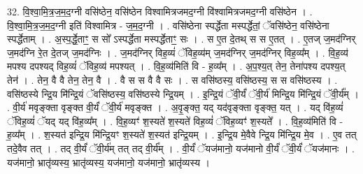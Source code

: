 \documentclass[17pt]{extarticle}
\begin{document}
32. वि॒श्वा॒मि॒त्र॒ज॒म॒द॒ग्नी वसि॑ष्ठेन॒ वसि॑ष्ठेन विश्वामित्रजमद॒ग्नी वि॑श्वामित्रजमद॒ग्नी वसि॑ष्ठेन । . वि॒श्वा॒मि॒त्र॒ज॒म॒द॒ग्नी इति॑ विश्वामित्र - ज॒म॒द॒ग्नी । . वसि॑ष्ठेना स्पर्द्धेता मस्पर्द्धेतां॒ ॅवसि॑ष्ठेन॒ वसि॑ष्ठेना स्पर्द्धेताम् । . अ॒स्प॒र्द्धे॒ताꣳ॒॒ स सो᳚ ऽस्पर्द्धेता मस्पर्द्धेताꣳ॒॒ सः । . स ए॒त दे॒तथ् स स ए॒तत् । . ए॒तज् ज॒मद॑ग्निर् ज॒मद॑ग्नि रे॒त दे॒तज् ज॒मद॑ग्निः । . ज॒मद॑ग्निर् विह॒व्यं॑ ॅविह॒व्य॑म् ज॒मद॑ग्निर् ज॒मद॑ग्निर् विह॒व्य᳚म् । . वि॒ह॒व्य॑ मपश्य दपश्यद् विह॒व्यं॑ ॅविह॒व्य॑ मपश्यत् । . वि॒ह॒व्य॑मिति॑ वि - ह॒व्य᳚म् । . अ॒प॒श्य॒त् तेन॒ तेना॑पश्य दपश्य॒त् तेन॑ । . तेन॒ वै वै तेन॒ तेन॒ वै । . वै स स वै वै सः । . स वसि॑ष्ठस्य॒ वसि॑ष्ठस्य॒ स स वसि॑ष्ठस्य । . वसि॑ष्ठस्ये न्द्रि॒य मि॑न्द्रि॒यं ॅवसि॑ष्ठस्य॒ वसि॑ष्ठस्ये न्द्रि॒यम् । . इ॒न्द्रि॒यं ॅवी॒र्यं॑ ॅवी॒र्य॑ मिन्द्रि॒य मि॑न्द्रि॒यं ॅवी॒र्य᳚म् । . वी॒र्य॑ मवृङ्क्ता वृङ्क्त वी॒र्यं॑ ॅवी॒र्य॑ मवृङ्क्त । . अ॒वृ॒ङ्क्त॒ यद् यद॑वृङ्क्ता वृङ्क्त॒ यत् । . यद् वि॑ह॒व्यं॑ ॅविह॒व्यं॑ ॅयद् यद् वि॑ह॒व्य᳚म् । . वि॒ह॒व्यꣳ॑ श॒स्यते॑ श॒स्यते॑ विह॒व्यं॑ ॅविह॒व्यꣳ॑ श॒स्यते᳚ । . वि॒ह॒व्य॑मिति॑ वि - ह॒व्य᳚म् । . श॒स्यत॑ इन्द्रि॒य मि॑न्द्रि॒यꣳ श॒स्यते॑ श॒स्यत॑ इन्द्रि॒यम् । . इ॒न्द्रि॒य मे॒वैवे न्द्रि॒य मि॑न्द्रि॒य मे॒व । . ए॒व तत् तदे॒वैव तत् । . तद् वी॒र्यं॑ ॅवी॒र्य॑म् तत् तद् वी॒र्य᳚म् । . वी॒र्यं॑ ॅयज॑मानो॒ यज॑मानो वी॒र्यं॑ ॅवी॒र्यं॑ ॅयज॑मानः । . यज॑मानो॒ भ्रातृ॑व्यस्य॒ भ्रातृ॑व्यस्य॒ यज॑मानो॒ यज॑मानो॒ भ्रातृ॑व्यस्य । \newline
\end{document}
